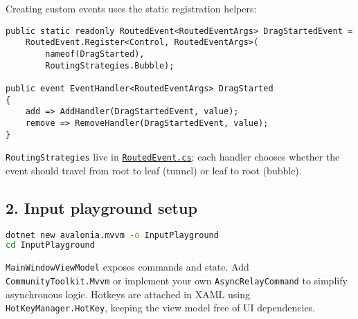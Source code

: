 Creating custom events uses the static registration helpers:

\begin{lstlisting}
public static readonly RoutedEvent<RoutedEventArgs> DragStartedEvent =
    RoutedEvent.Register<Control, RoutedEventArgs>(
        nameof(DragStarted),
        RoutingStrategies.Bubble);

public event EventHandler<RoutedEventArgs> DragStarted
{
    add => AddHandler(DragStartedEvent, value);
    remove => RemoveHandler(DragStartedEvent, value);
}
\end{lstlisting}

\passthrough{\lstinline!RoutingStrategies!} live in
\href{https://github.com/AvaloniaUI/Avalonia/blob/master/src/Avalonia.Interactivity/RoutedEvent.cs}{\passthrough{\lstinline!RoutedEvent.cs!}};
each handler chooses whether the event should travel from root to leaf
(tunnel) or leaf to root (bubble).

\subsection{2. Input playground setup}\label{input-playground-setup}

\begin{lstlisting}[language=bash]
dotnet new avalonia.mvvm -o InputPlayground
cd InputPlayground
\end{lstlisting}

\passthrough{\lstinline!MainWindowViewModel!} exposes commands and
state. Add \passthrough{\lstinline!CommunityToolkit.Mvvm!} or implement
your own \passthrough{\lstinline!AsyncRelayCommand!} to simplify
asynchronous logic. Hotkeys are attached in XAML using
\passthrough{\lstinline!HotKeyManager.HotKey!}, keeping the view model
free of UI dependencies.

